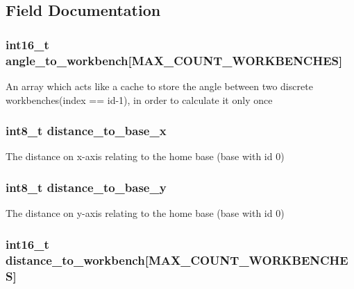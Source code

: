 \subsection{\-Field \-Documentation}
\hypertarget{structworkbench_a0142206cb187b4f67026aab9bd200f75}{
\subsubsection[{angle\-\_\-to\-\_\-workbench}]{\setlength{\rightskip}{0pt plus 5cm}int16\-\_\-t {\bf angle\-\_\-to\-\_\-workbench}\mbox{[}{\bf \-M\-A\-X\-\_\-\-C\-O\-U\-N\-T\-\_\-\-W\-O\-R\-K\-B\-E\-N\-C\-H\-E\-S}\mbox{]}}}\label{structworkbench_a0142206cb187b4f67026aab9bd200f75}
\-An array which acts like a cache to store the angle between two discrete workbenches(index == id-\/1), in order to calculate it only once \hypertarget{structworkbench_a31c15cc70543dfcb5e6954f6c41e8293}{
\subsubsection[{distance\-\_\-to\-\_\-base\-\_\-x}]{\setlength{\rightskip}{0pt plus 5cm}int8\-\_\-t {\bf distance\-\_\-to\-\_\-base\-\_\-x}}}\label{structworkbench_a31c15cc70543dfcb5e6954f6c41e8293}
\-The distance on x-\/axis relating to the home base (base with id 0) \hypertarget{structworkbench_ae7ebe831a9960e3b79cdd96ab4c149a2}{
\subsubsection[{distance\-\_\-to\-\_\-base\-\_\-y}]{\setlength{\rightskip}{0pt plus 5cm}int8\-\_\-t {\bf distance\-\_\-to\-\_\-base\-\_\-y}}}\label{structworkbench_ae7ebe831a9960e3b79cdd96ab4c149a2}
\-The distance on y-\/axis relating to the home base (base with id 0) \hypertarget{structworkbench_a92acc2b5806eaa0de00fc068add07494}{
\subsubsection[{distance\-\_\-to\-\_\-workbench}]{\setlength{\rightskip}{0pt plus 5cm}int16\-\_\-t {\bf distance\-\_\-to\-\_\-workbench}\mbox{[}{\bf \-M\-A\-X\-\_\-\-C\-O\-U\-N\-T\-\_\-\-W\-O\-R\-K\-B\-E\-N\-C\-H\-E\-S}\mbox{]}}}\label{structworkbench_a92acc2b5806eaa0de00fc068add07494}
